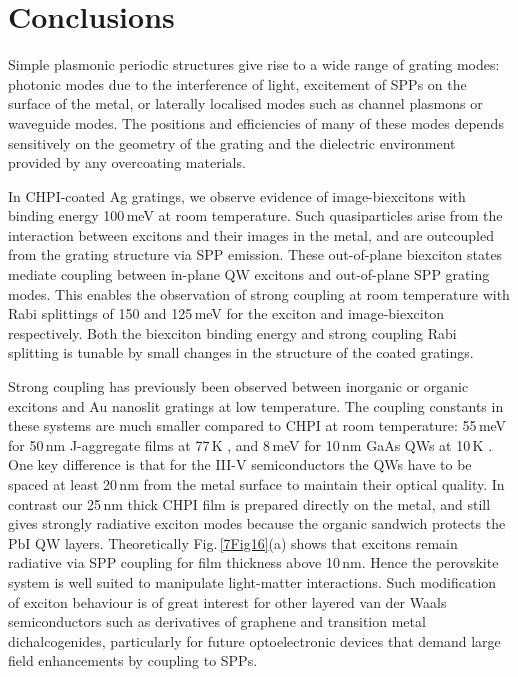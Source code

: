\section{Conclusions}
Simple plasmonic periodic structures give rise to a wide range of grating modes: photonic modes due to the interference of light, excitement of SPPs on the surface of the metal, or laterally localised modes such as channel plasmons or waveguide modes. The positions and efficiencies of many of these modes depends sensitively on the geometry of the grating and the dielectric environment provided by any overcoating materials.

In CHPI-coated Ag gratings, we observe evidence of image-biexcitons with binding energy 100\,meV at room temperature. Such quasiparticles arise from the interaction between excitons and their images in the metal, and are outcoupled from the grating structure via SPP emission. These out-of-plane biexciton states mediate coupling between in-plane QW excitons and out-of-plane SPP grating modes. This enables the observation of strong coupling at room temperature with Rabi splittings of 150 and 125\,meV for the exciton and image-biexciton respectively. Both the biexciton binding energy and strong coupling Rabi splitting is tunable by small changes in the structure of the coated gratings.

Strong coupling has previously been observed between inorganic or organic excitons and Au nanoslit gratings at low temperature. The coupling constants in these systems are much smaller compared to CHPI at room temperature: 55\,meV for 50\,nm J-aggregate films at 77\,K \cite{Vasa2010}, and 8\,meV for 10\,nm GaAs QWs at 10\,K \cite{Vasa2008}. One key difference is that for the III-V semiconductors the QWs have to be spaced at least 20\,nm from the metal surface to maintain their optical quality. In contrast our 25\,nm thick CHPI film is prepared directly on the metal, and still gives strongly radiative exciton modes because the organic sandwich protects the PbI QW layers. Theoretically Fig.\,\ref{7Fig16}(a) shows that excitons remain radiative via SPP coupling for film thickness above 10\,nm. Hence the perovskite system is well suited to manipulate light-matter interactions. Such modification of exciton behaviour is of great interest for other layered van der Waals semiconductors such as derivatives of graphene and transition metal dichalcogenides, particularly for future optoelectronic devices that demand large field enhancements by coupling to SPPs.